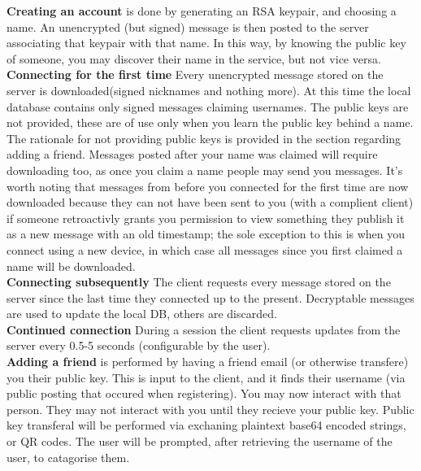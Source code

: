 \textbf{Creating an account} is done by generating an RSA keypair, and choosing
a name. An unencrypted (but signed) message is then posted to the server
associating that keypair with that name. In this way, by knowing the public key
of someone, you may discover their name in the service, but not vice versa.\\

\textbf{Connecting for the first time} Every unencrypted message stored on the
server is downloaded(signed nicknames and nothing more). At this time the local
database contains only signed messages
claiming usernames. The public keys are not provided, these are of use only when
you learn the public key behind a name. The rationale for not providing public
keys is provided in the section regarding adding a friend. Messages posted
after your name was claimed will require downloading too, as once you claim a
name people may send you messages. It's worth noting that messages from before
you connected for the first time are now downloaded because they can not have
been sent to you (with a complient client) if someone retroactivly grants you
permission to view something they publish it as a new message with an old
timestamp; the sole exception to this is when you connect using a new device,
in which case all messages since you first claimed a name will be downloaded.\\

\textbf{Connecting subsequently} The client requests every message stored on the
server since the last time they connected up to the present. Decryptable
messages are used to update the local DB, others are discarded.\\

\textbf{Continued connection} During a session the client requests updates from
the server every 0.5-5 seconds (configurable by the user).\\

\textbf{Adding a friend} is performed by having a friend email (or otherwise
transfere) you their public key. This is input to the client, and it finds their
username (via public posting that occured when registering). You may now
interact with that person. They may not interact with you until they recieve
your public key. Public key transferal will be performed via exchaning plaintext
base64 encoded strings, or QR codes. The user will be prompted, after retrieving
the username of the user, to catagorise them.\\

